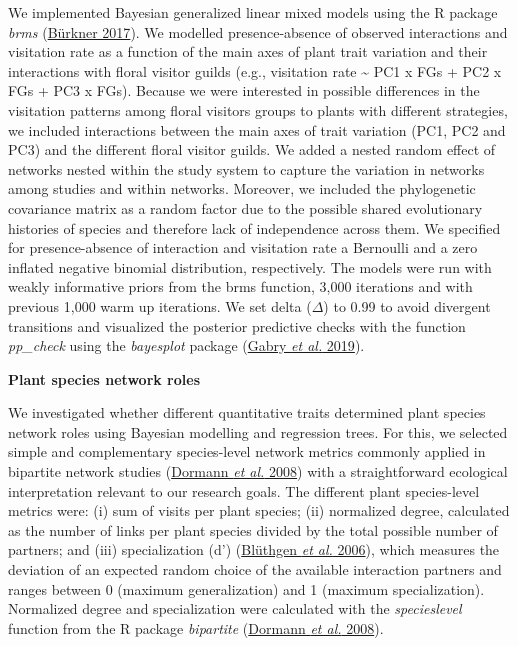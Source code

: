 \documentclass[
  12pt,
  a4paper,
]{article}
\begin{document}
We implemented Bayesian generalized linear mixed models using the R package \emph{brms} (\protect\hyperlink{ref-burkner2017}{Bürkner 2017}). We modelled presence-absence of observed interactions and visitation rate as a function of the main axes of plant trait variation and their interactions with floral visitor guilds (e.g., visitation rate \textasciitilde{} PC1 x FGs + PC2 x FGs + PC3 x FGs). Because we were interested in possible differences in the visitation patterns among floral visitors groups to plants with different strategies, we included interactions between the main axes of trait variation (PC1, PC2 and PC3) and the different floral visitor guilds. We added a nested random effect of networks nested within the study system to capture the variation in networks among studies and within networks. Moreover, we included the phylogenetic covariance matrix as a random factor due to the possible shared evolutionary histories of species and therefore lack of independence across them. We specified for presence-absence of interaction and visitation rate a Bernoulli and a zero inflated negative binomial distribution, respectively. The models were run with weakly informative priors from the brms function, 3,000 iterations and with previous 1,000 warm up iterations. We set delta (\(\Delta\)) to 0.99 to avoid divergent transitions and visualized the posterior predictive checks with the function \emph{pp\_check} using the \emph{bayesplot} package (\protect\hyperlink{ref-gabry2019}{Gabry \emph{et al.} 2019}).

\textbf{Plant species network roles}

We investigated whether different quantitative traits determined plant species network roles using Bayesian modelling and regression trees. For this, we selected simple and complementary species-level network metrics commonly applied in bipartite network studies (\protect\hyperlink{ref-dormann2008}{Dormann \emph{et al.} 2008}) with a straightforward ecological interpretation relevant to our research goals. The different plant species-level metrics were: (i) sum of visits per plant species; (ii) normalized degree, calculated as the number of links per plant species divided by the total possible number of partners; and (iii) specialization (d') (\protect\hyperlink{ref-bluthgen2006}{Blüthgen \emph{et al.} 2006}), which measures the deviation of an expected random choice of the available interaction partners and ranges between 0 (maximum generalization) and 1 (maximum specialization). Normalized degree and specialization were calculated with the \emph{specieslevel} function from the R package \emph{bipartite} (\protect\hyperlink{ref-dormann2008}{Dormann \emph{et al.} 2008}).
\end{document}
